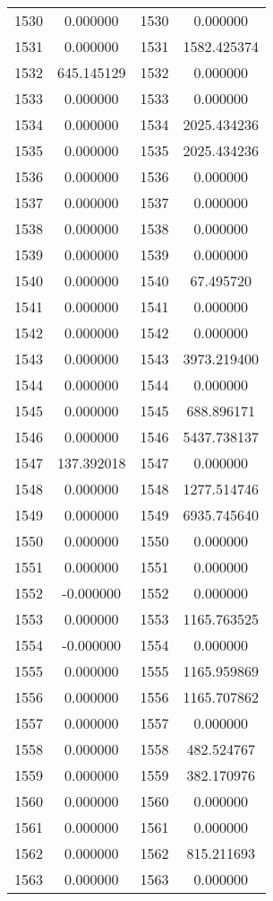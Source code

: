 \documentclass[12pt]{article}
\begin{document}
\begin{longtable}{@{}cccc@{}}
1530 & 0.000000 & 1530 & 0.000000 \\
1531 & 0.000000 & 1531 & 1582.425374 \\
1532 & 645.145129 & 1532 & 0.000000 \\
1533 & 0.000000 & 1533 & 0.000000 \\
1534 & 0.000000 & 1534 & 2025.434236 \\
1535 & 0.000000 & 1535 & 2025.434236 \\
1536 & 0.000000 & 1536 & 0.000000 \\
1537 & 0.000000 & 1537 & 0.000000 \\
1538 & 0.000000 & 1538 & 0.000000 \\
1539 & 0.000000 & 1539 & 0.000000 \\
1540 & 0.000000 & 1540 & 67.495720 \\
1541 & 0.000000 & 1541 & 0.000000 \\
1542 & 0.000000 & 1542 & 0.000000 \\
1543 & 0.000000 & 1543 & 3973.219400 \\
1544 & 0.000000 & 1544 & 0.000000 \\
1545 & 0.000000 & 1545 & 688.896171 \\
1546 & 0.000000 & 1546 & 5437.738137 \\
1547 & 137.392018 & 1547 & 0.000000 \\
1548 & 0.000000 & 1548 & 1277.514746 \\
1549 & 0.000000 & 1549 & 6935.745640 \\
1550 & 0.000000 & 1550 & 0.000000 \\
1551 & 0.000000 & 1551 & 0.000000 \\
1552 & -0.000000 & 1552 & 0.000000 \\
1553 & 0.000000 & 1553 & 1165.763525 \\
1554 & -0.000000 & 1554 & 0.000000 \\
1555 & 0.000000 & 1555 & 1165.959869 \\
1556 & 0.000000 & 1556 & 1165.707862 \\
1557 & 0.000000 & 1557 & 0.000000 \\
1558 & 0.000000 & 1558 & 482.524767 \\
1559 & 0.000000 & 1559 & 382.170976 \\
1560 & 0.000000 & 1560 & 0.000000 \\
1561 & 0.000000 & 1561 & 0.000000 \\
1562 & 0.000000 & 1562 & 815.211693 \\
1563 & 0.000000 & 1563 & 0.000000 \\

\end{longtable}
\end{document}
